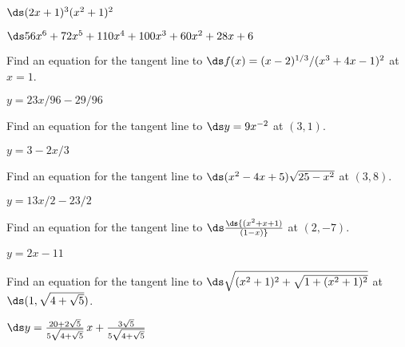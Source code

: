 \begin{exercises}
\begin{exercise} $\ds (2x+1)^3(x^2+1)^2$
\begin{answer} $\ds 56x^6+72x^5+110x^4+100x^3+60x^2+28x+6$
\end{answer}\end{exercise}

\endtwocol
\bsk

\begin{exercise}  Find an equation for the tangent line to 
$\ds f(x) = (x-2)^{1/3}/(x^3 + 4x - 1)^2$ at $x=1$.
\begin{answer} $y=23x/96-29/96$
\end{answer}\end{exercise}

\begin{exercise} Find an equation for the tangent line to $\ds y=9x^{-2}$ at $(3,1)$.
\begin{answer} $y=3-2x/3$
\end{answer}\end{exercise}

\begin{exercise} Find an equation for the tangent line to $\ds (x^2-4x+5)\sqrt{25-x^2}$ 
at $(3,8)$.
\begin{answer} $y=13x/2-23/2$
\end{answer}\end{exercise}

\begin{exercise} Find an equation for the tangent line to $\ds \ds{(x^2+x+1)\over(1-x)}$ 
at $(2,-7)$.
\begin{answer} $y=2x-11$
\end{answer}\end{exercise}

\begin{exercise} Find an equation for the tangent line to 
$\ds \sqrt{(x^2+1)^2+\sqrt{1+(x^2+1)^2}}$
at $\ds (1,\sqrt{4+\sqrt{5}})$.
\begin{answer} $\ds y=
{20+2\sqrt5\over5\sqrt{4+\sqrt5}}\,x+{3\sqrt5\over5\sqrt{4+\sqrt5}}$
\end{answer}\end{exercise}

\end{exercises}















